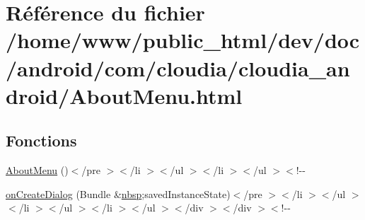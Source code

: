 \hypertarget{_about_menu_8html}{\section{Référence du fichier /home/www/public\-\_\-html/dev/doc/android/com/cloudia/cloudia\-\_\-android/\-About\-Menu.html}
\label{_about_menu_8html}
}
\subsection*{Fonctions}
\begin{DoxyCompactItemize}
\item 
\hyperlink{_about_menu_8html_a3ae28f15660c93d53c9fa7ccac5dea06}{About\-Menu} ()$<$/pre $>$$<$/li $>$$<$/ul $>$$<$/li $>$$<$/ul $>$$<$!-\/-\/
\item 
\hyperlink{_about_menu_8html_a6c74b6612904a81e787fa5b5a7751241}{on\-Create\-Dialog} (Bundle \&\hyperlink{_tools_8html_aef915316f784c9063d942974538301a6}{nbsp};saved\-Instance\-State)$<$/pre $>$$<$/li $>$$<$/ul $>$$<$/li $>$$<$/ul $>$$<$/li $>$$<$/ul $>$$<$/div $>$$<$/div $>$$<$!-\/-\/
\end{DoxyCompactItemize}

